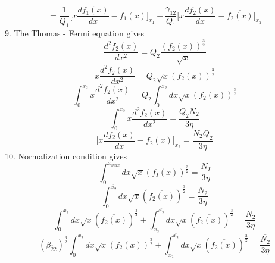 \documentclass[fleqn, 10pt]{article}
\begin{document}
           \begin{equation}
               = \frac{1}{Q_1} \biggl[ x \frac{df_1(x)}{dx} - f_1(x) \biggr]_{x_1} - \frac{\gamma_{1\overline{2}}}{Q_1} \biggl[ x \frac{d\overline{f_{2}(x)}}{dx} - \overline{f_{2}(x)} \biggr]_{\overline{x_{2}}}
               \label{114}
           \end{equation}
9.          The Thomas - Fermi equation gives 
    \begin{equation*}
        \frac{d^2f_{2}(x)}{dx^2} = Q_{2} \frac{(f_{2}(x))^\frac{3}{2}}{\sqrt{x}}
    \end{equation*}
    \begin{equation*}
        x\frac{d^2f_{2}(x)}{dx^2} = Q_{2}\sqrt{x}(f_{2}(x))^\frac{3}{2}
    \end{equation*}
    \begin{equation*}
        \int^{x_{2}}_0 x \frac{d^2f_{2}(x)}{dx^2} = Q_{2} \int^{x_{2}}_0 dx \sqrt{x} (f_{2}(x))^\frac{3}{2}
    \end{equation*}
    \begin{equation*}
        \int^{x_{2}}_0 x\frac{d^2f_{2}(x)}{dx^2} = \frac{Q_{2}N_{2}}{3\eta} \end{equation*}
        \begin{equation}
            \biggl[ x \frac{df_{2}(x)}{dx}- f_{2}(x) \biggr]_{x_{2}} = \frac{N_{2}Q_{2}}{3\eta}
            \label{84}
        \end{equation}
10.        Normalization condition gives
        \begin{equation*}
            \int^{x_{max}}_0 dx \sqrt{x} (f_I(x))^\frac{3}{2} = \frac{N_I}{3\eta}
        \end{equation*}
        \begin{equation*}
            \int^{\overline{x_{2}}}_0 dx \sqrt{x} (\overline{f_{2}(x)})^\frac{3}{2} = \frac{\overline{N_{2}}}{3\eta}
        \end{equation*}
        \begin{equation*}
            \int^{x_{2}}_0 dx \sqrt{x}(\overline{f_{2}(x)})^\frac{3}{2} + \int^{\overline{x_{2}}}_{x_{2}}dx \sqrt{x} (\overline{f_{2}(x)})^\frac{3}{2} = \frac{\overline{N_{2}}}{3\eta}
        \end{equation*}
        \begin{equation*}
            (\beta_{\overline{2}2})^\frac{3}{2} \int^{x_{2}}_0 dx \sqrt{x}(f_{2}(x))^\frac{3}{2} + \int^{\overline{x_{2}}}_{x_{2}} dx \sqrt{x} (\overline{f_{2}(x)})^\frac{3}{2} = \frac{\overline{N_{2}}}{3\eta}
        \end{equation*}
\end{document}
